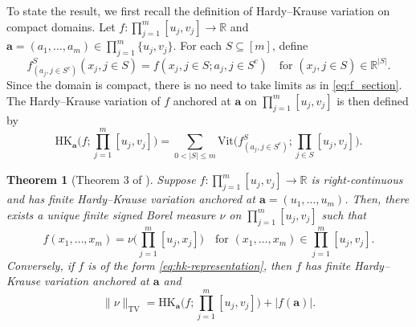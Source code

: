 \documentclass[10pt]{article}
\newtheorem{theorem}{Theorem}
\newcommand{\R}{{\mathbb R}}
\newcommand{\vit}{{\text{Vit}}}
\newcommand{\hk}{{\text{HK}}}
\newcommand{\abf}{{\mathbf{a}}}
\begin{document}
To state the result, we first 
recall the definition of Hardy–Krause variation on compact domains.
Let $f: \prod_{j = 1}^{m} [u_j, v_j] \to \R$ and 
$\abf = (a_1, \dots, a_m) \in \prod_{j = 1}^{m} \{u_j, v_j\}$. 
For each $S \subseteq [m]$, define
\begin{equation*}
    f^S_{(a_j, j \in S^c)}(x_j, j \in S) 
    = f(x_j, j \in S; a_j, j \in S^c)
    \quad \text{for } (x_j, j \in S) \in \R^{|S|}.
\end{equation*}
Since the domain is compact, there is no need to take limits as 
in \eqref{eq:f_section}.
The Hardy–Krause variation of $f$ anchored at $\abf$ on
$\prod_{j = 1}^{m} [u_j, v_j]$ is then defined by
\begin{equation*}
    \hk_{\abf}\Big(f; \prod_{j = 1}^{m} [u_j, v_j]\Big)
    = \sum_{0 < |S| \le m} \vit\Big(f^S_{(a_j, j \in S^c)}; 
    \prod_{j \in S} [u_j, v_j]\Big).
\end{equation*}

\begin{theorem}[Theorem 3 of \citet{aistleitner2015functions}]
\label{thm:aistleitner}
Suppose $f: \prod_{j = 1}^{m} [u_j, v_j] \to \R$ is  
right-continuous and has finite Hardy–Krause variation anchored at 
$\abf = (u_1, \dots, u_m)$. Then, there exists a unique finite 
signed Borel measure $\nu$ on $\prod_{j = 1}^{m} [u_j, v_j]$ such that
\begin{equation}\label{eq:hk-representation}
    f(x_1, \dots, x_m) = \nu\Big(\prod_{j = 1}^{m} [u_j, x_j]\Big) 
    \quad \text{for } (x_1, \dots, x_m) \in \prod_{j = 1}^{m} [u_j, v_j].
\end{equation}
Conversely, if $f$ is of the form \eqref{eq:hk-representation}, then $f$ has 
finite Hardy–Krause variation anchored at $\abf$ and 
\begin{equation*}
    \|\nu\|_{\text{TV}} 
    = \hk_{\abf}\Big(f; \prod_{j = 1}^{m} [u_j, v_j]\Big) 
    + |f(\abf)|.
\end{equation*}
\end{theorem}
\end{document}
